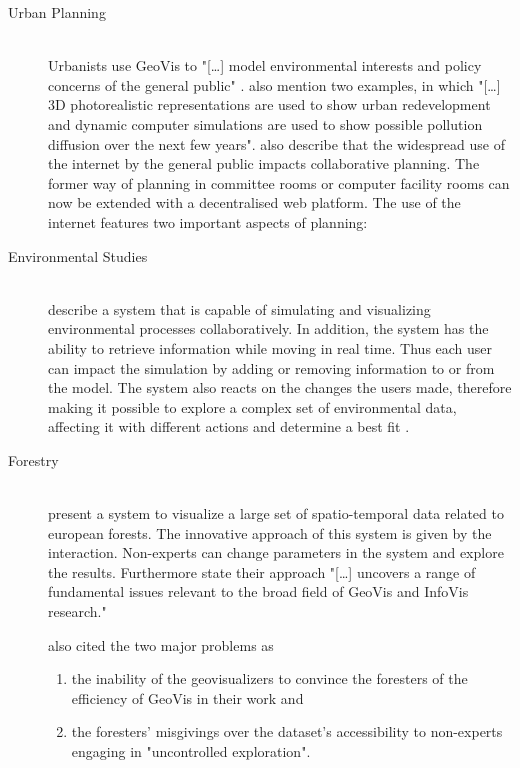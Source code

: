 \begin{description}

\item[Urban Planning] \hfill \\
Urbanists use \ac{GeoVis} to "[\ldots] model environmental interests and policy concerns of the general public" . \citeauthor{Jiang2003} also mention two examples, in which "[\ldots] 3D photorealistic representations are used to show urban redevelopment and dynamic computer simulations are used to show possible pollution diffusion over the next few years".
\citeauthor{Jiang2003} also describe that the widespread use of the internet by the general public impacts collaborative planning. The former way of planning in committee rooms or computer facility rooms can now be extended with a decentralised web platform. The use of the internet features two important aspects of planning:

\item[Environmental Studies] \hfill \\
\citeauthor{Danado2005} describe a system that is capable of simulating and visualizing environmental processes collaboratively. In addition, the system has the ability to retrieve information while moving in real time. Thus each user can impact the simulation by adding or removing information to or from the model. The system also reacts on the changes the users made, therefore making it possible to explore a complex set of environmental data, affecting it with different actions and determine a best fit .

\item[Forestry] \hfill \\
\citeauthor{Andrienko2007} present a system to visualize a large set of spatio-temporal data related to european forests. The innovative approach of this system is given by the interaction. Non-experts can change parameters in the system and explore the results. Furthermore \citeauthor{Andrienko2007} state their approach "[\ldots] uncovers a range of fundamental issues relevant to the broad field of \ac{GeoVis} and \ac{InfoVis} research."

\citeauthor{Andrienko2007} also cited the two major problems as
\begin{enumerate}
\item the inability of the geovisualizers to convince the foresters of the efficiency of \ac{GeoVis} in their work and
\item the foresters' misgivings over the dataset's accessibility to non-experts engaging in "uncontrolled exploration".
\end{enumerate}


\end{description}
